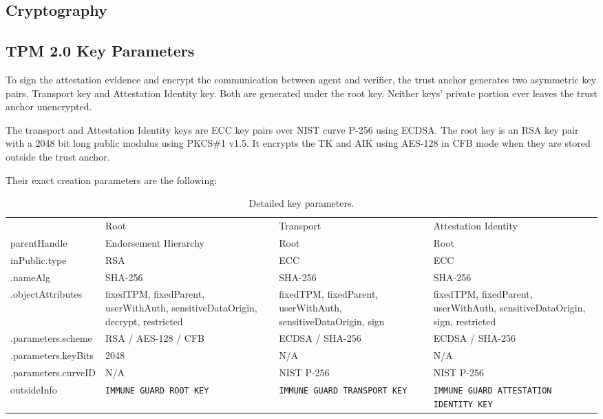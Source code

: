 \documentclass[a4paper,oneside,10pt,extrafontsizes]{memoir}
\begin{document}
\begin{appendix}
\chapter{Cryptography}

\section{TPM 2.0 Key Parameters}
\label{app:keys}

To sign the attestation evidence and encrypt the communication between agent
and verifier, the trust anchor generates two asymmetric key pairs, Transport
key and Attestation Identity key. Both are generated under the root key.
Neither keys' private portion ever leaves the trust anchor unencrypted.

The transport and Attestation Identity keys are ECC key pairs over NIST curve
P-256 using ECDSA. The root key is an RSA key pair with a 2048 bit long public
modulus using PKCS\#1 v1.5. It encrypts the TK and AIK using AES-128 in CFB
mode when they are stored outside the trust anchor.

Their exact creation parameters are the following:

\begin{table}[htbp]
  \centerfloat
  \begin{tabular}{@{}p{4cm}*{3}{L{\relax}}@{}}
    \toprule
    & Root & Transport & Attestation Identity \\
    parentHandle & Endorsement Hierarchy & Root & Root \\
    inPublic.type & RSA & ECC & ECC \\
    \quad.nameAlg & SHA-256 & SHA-256 & SHA-256 \\
    \quad.objectAttributes & fixedTPM, fixedParent, userWithAuth,
    sensitiveDataOrigin, decrypt, restricted & fixedTPM, fixedParent,
    userWithAuth, sensitiveDataOrigin, sign & fixedTPM, fixedParent,
    userWithAuth, sensitiveDataOrigin, sign, restricted \\
    \quad.parameters.scheme & RSA / AES-128 / CFB & ECDSA / SHA-256 & ECDSA /
    SHA-256 \\
    \quad.parameters.keyBits & 2048 & N/A & N/A \\
    \quad.parameters.curveID & N/A & NIST P-256 & NIST P-256 \\
    outsideInfo & \texttt{IMMUNE GUARD ROOT KEY} & \texttt{IMMUNE GUARD TRANSPORT KEY} & \texttt{IMMUNE GUARD ATTESTATION IDENTITY KEY} \\
    \bottomrule
  \end{tabular}
  \caption{Detailed key parameters.}
  \label{fig:keys} 
\end{table}


\end{appendix}
\end{document}
